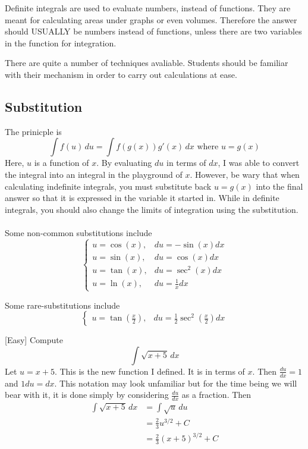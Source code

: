 \documentclass[a4paper]{article}
\begin{document}
Definite integrals are used to evaluate numbers, instead of functions. They are meant for calculating areas under graphs or even volumes. Therefore the answer should USUALLY be numbers instead of functions, unless there are two variables in the function for integration. \linebreak

There are quite a number of techniques avaliable. Students should be familiar with their mechanism in order to carry out calculations at ease. 

\subsection{Substitution}
The prinicple is $$\int f(u)\,du=\int f(g(x))g'(x)\,dx\text{ where }u=g(x)$$
Here, $u$ is a function of $x$. By evaluating $du$ in terms of $dx$, I was able to convert the integral into an integral in the playground of $x$. However,  be wary that when calculating indefinite integrals, you must substitute back $u=g(x)$ into the final answer so that it is expressed in the variable it started in. While in definite integrals, you should also change the limits of integration using the substitution. \\~\\
Some non-common substitutions include $$\begin{cases}
u=\cos(x), & du=-\sin(x)dx\\
u=\sin(x), & du=\cos(x)dx\\
u=\tan(x), & du=\sec^2(x)dx\\
u=\ln(x), & du=\frac{1}{x}dx
\end{cases}$$

Some rare-substitutions include $$\begin{cases}
u=\tan\left(\frac{x}{2}\right), & du=\frac{1}{2}\sec^2\left(\frac{x}{2}\right)dx
\end{cases}$$

\begin{eg}{[Easy]}{} Compute $$\int \sqrt{x+5}\,dx$$ \tcbline
Let $u=x+5$. This is the new function I defined. It is in terms of $x$. Then $\frac{du}{dx}=1$ and $1du=dx$. This notation may look unfamiliar but for the time being we will bear with it, it is done simply by considering $\frac{du}{dx}$ as a fraction. Then
\begin{align*}
\int\sqrt{x+5}\,dx&=\int\sqrt{u}\,du\tag{Applying $u=x+5$ and $1du=dx$}\\
&=\frac{2}{3}u^{3/2}+C\\
&=\frac{2}{3}(x+5)^{3/2}+C\tag{Substitute in $u=x+5$}
\end{align*}
\end{eg}
\end{document}
